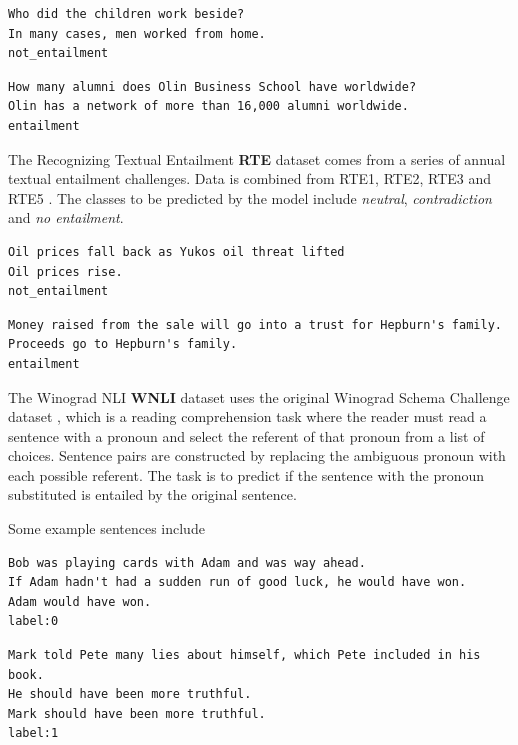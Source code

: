 \documentclass[a4paper,12pt,twoside,openright]{report}
\begin{document}
\begin{verbatim}
Who did the children work beside?	
In many cases, men worked from home.
not_entailment
\end{verbatim}

\begin{verbatim}
How many alumni does Olin Business School have worldwide?
Olin has a network of more than 16,000 alumni worldwide.
entailment
\end{verbatim}


The Recognizing Textual Entailment \textbf{RTE}  dataset comes from a series of annual textual entailment challenges. 
Data is combined from RTE1, RTE2, RTE3 and RTE5 \cite{dagan2005} \cite{bar2006} \cite{bentivogli2009} \cite{giampiccolo2007}. 
The classes to be predicted by the model include \textit{neutral}, \textit{contradiction} and \textit{no entailment}.


\begin{verbatim}
Oil prices fall back as Yukos oil threat lifted	
Oil prices rise.
not_entailment
\end{verbatim}

\begin{verbatim}
Money raised from the sale will go into a trust for Hepburn's family.
Proceeds go to Hepburn's family.	
entailment
\end{verbatim}


The Winograd NLI \textbf{WNLI} dataset uses the original Winograd Schema Challenge dataset \cite{levesque2012}, which is a reading comprehension task where the reader must read a sentence with a pronoun and select the referent of that pronoun from a list of choices. 
Sentence pairs are constructed by replacing the ambiguous pronoun with each possible referent.
The task is to predict if the sentence with the pronoun substituted is entailed by the original sentence.

Some example sentences include 

\begin{verbatim}
Bob was playing cards with Adam and was way ahead.
If Adam hadn't had a sudden run of good luck, he would have won.	Adam would have won.
label:0
\end{verbatim}

\begin{verbatim}
Mark told Pete many lies about himself, which Pete included in his book. 
He should have been more truthful.	
Mark should have been more truthful.
label:1
\end{verbatim}
\end{document}
